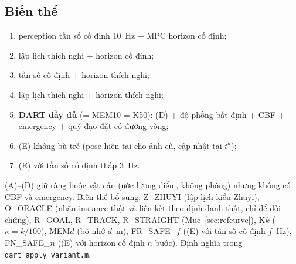 \documentclass[11pt,a4paper]{article}
\numberwithin{equation}{section}
\newcommand{\code}[1]{\texttt{\small #1}}
\theoremstyle{definition}
\theoremstyle{plain}
\theoremstyle{remark}
\begin{document}
\subsection{Biến thể}
\label{sec:ablation}
\begin{enumerate}[label=(\Alph*)]
\item perception tần số cố định 10~Hz + MPC horizon cố định;
\item lập lịch thích nghi + horizon cố định;
\item tần số cố định + horizon thích nghi;
\item lập lịch thích nghi + horizon thích nghi;
\item \textbf{DART đầy đủ} (= MEM10 = K50): (D) + độ phồng bất định + CBF + emergency + quỹ đạo đặt có đường vòng;
\item (E) không bù trễ (pose hiện tại cho ảnh cũ, cập nhật tại $t^a$);
\item[(G)] (E) với tần số cố định thấp 3~Hz.
\end{enumerate}
(A)--(D) giữ ràng buộc vật cản (ước lượng điểm, không phồng) nhưng không có CBF và emergency. Biến thể bổ sung: Z\_ZHUYI (lập lịch kiểu Zhuyi), O\_ORACLE (nhãn instance thật và liên kết theo định danh thật, chỉ để đối chứng), R\_GOAL, R\_TRACK, R\_STRAIGHT (Mục~\ref{sec:refcurve}), K$k$ ($\kappa=k/100$), MEM$d$ (bộ nhớ $d$~m), FR\_SAFE\_$f$ ((E) với tần số cố định $f$~Hz), FN\_SAFE\_$n$ ((E) với horizon cố định $n$ bước). Định nghĩa trong \code{dart\_apply\_variant.m}.
\end{document}
